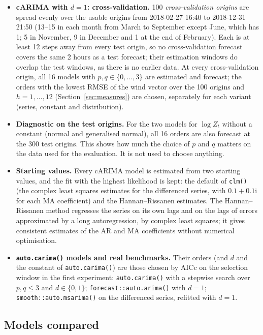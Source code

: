 \documentclass[11pt,a4paper]{article}
\newcommand{\iu}{\mathrm{i}}
\newcommand{\code}[1]{\texttt{#1}}
\newcommand{\1}{\mathbf{1}}
\begin{document}
\begin{itemize}
  \item \textbf{cARIMA with $d = 1$: cross-validation.} 100 \emph{cross-validation origins} are
    spread evenly over the usable origins from 2018-02-27 16:40 to 2018-12-31 21:50 (13--15 in each
    month from March to September except June, which has 1; 5 in November, 9 in December and 1 at
    the end of February). Each is at least 12
    steps away from every test origin, so no cross-validation forecast covers the same 2 hours as a
    test forecast; their estimation windows do overlap the test windows, as there is no earlier
    data. At every cross-validation origin, all 16 models with $p, q \in \{0, \dots, 3\}$ are
    estimated and forecast; the orders with the lowest RMSE of the wind vector over the 100
    origins and $h = 1, \dots, 12$ (Section~\ref{sec:measures}) are chosen, separately for each
    variant (series, constant and distribution).
  \item \textbf{Diagnostic on the test origins.} For the two models for $\log Z_t$ without a
    constant (normal and generalised normal), all 16 orders are also forecast at the 300 test
    origins. This shows how much the choice of $p$ and $q$ matters on the data used for the
    evaluation. It is not used to choose anything.
  \item \textbf{Starting values.} Every cARIMA model is estimated from two starting values, and
    the fit with the highest likelihood is kept: the default of \code{clm()} (the complex least
    squares estimates for the differenced series, with $0.1 + 0.1\iu$ for each MA coefficient)
    and the Hannan--Rissanen estimates. The Hannan--Rissanen method regresses the series on its
    own lags and on the lags of errors approximated by a long autoregression, by complex least
    squares; it gives consistent estimates of the AR and MA coefficients without numerical
    optimisation.
  \item \textbf{\code{auto.carima()} models and real benchmarks.} Their orders (and $d$ and the
    constant of \code{auto.carima()}) are those chosen by AICc on the selection window in the first
    experiment: \code{auto.carima()} with a stepwise search over $p, q \le 3$ and
    $d \in \{0, 1\}$; \code{forecast::auto.arima()} with $d = 1$; \code{smooth::auto.msarima()} on
    the differenced series, refitted with $d = 1$.
\end{itemize}

\subsection{Models compared}
\end{document}
